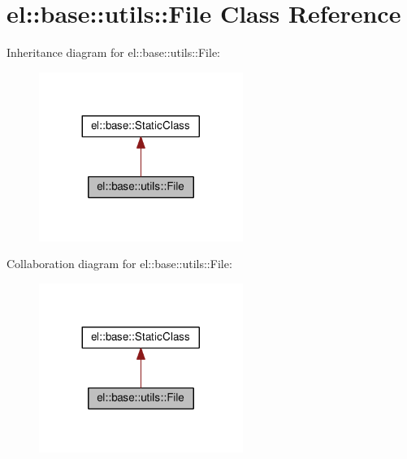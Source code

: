 \hypertarget{classel_1_1base_1_1utils_1_1_file}{}\section{el\+:\+:base\+:\+:utils\+:\+:File Class Reference}
\label{classel_1_1base_1_1utils_1_1_file}


Inheritance diagram for el\+:\+:base\+:\+:utils\+:\+:File\+:
\nopagebreak
\begin{figure}[H]
\begin{center}
\leavevmode
\includegraphics[width=188pt]{classel_1_1base_1_1utils_1_1_file__inherit__graph}
\end{center}
\end{figure}


Collaboration diagram for el\+:\+:base\+:\+:utils\+:\+:File\+:
\nopagebreak
\begin{figure}[H]
\begin{center}
\leavevmode
\includegraphics[width=188pt]{classel_1_1base_1_1utils_1_1_file__coll__graph}
\end{center}
\end{figure}
